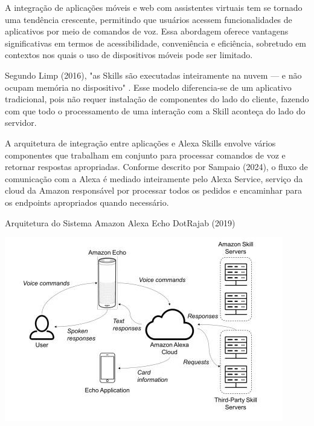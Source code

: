 A integração de aplicações móveis e web com assistentes virtuais tem se tornado uma tendência crescente, permitindo que usuários acessem funcionalidades de aplicativos por meio de comandos de voz.
Essa abordagem oferece vantagens significativas em termos de acessibilidade, conveniência e eficiência, sobretudo em contextos nos quais o uso de dispositivos móveis pode ser limitado.

Segundo Limp (2016), "as Skills são executadas inteiramente na nuvem — e não ocupam memória no dispositivo" \cite{wired2016}.
Esse modelo diferencia-se de um aplicativo tradicional, pois não requer instalação de componentes do lado do cliente, fazendo com que todo o processamento de uma interação com a Skill aconteça do lado do servidor.


A arquitetura de integração entre aplicações e Alexa Skills envolve vários componentes que trabalham em conjunto para processar comandos de voz e retornar respostas apropriadas. 
Conforme descrito por Sampaio (2024), o fluxo de comunicação com a Alexa é mediado inteiramente pelo Alexa Service, serviço da cloud da Amazon responsável por processar todos os pedidos e encaminhar para os endpoints apropriados quando necessário.



\begin{figura}{Arquitetura do Sistema Amazon Alexa Echo Dot}{Rajab (2019)}
    \begin{flushleft}
        \label{fig:alexa-architecture}
        \includegraphics[width=0.95\linewidth]{resources/floats/ilustracoes/AMAZON_ALEXA_ECHO_DOT_SYSTEM_ARCHITECTURE.png}
    \end{flushleft}
\end{figura}

